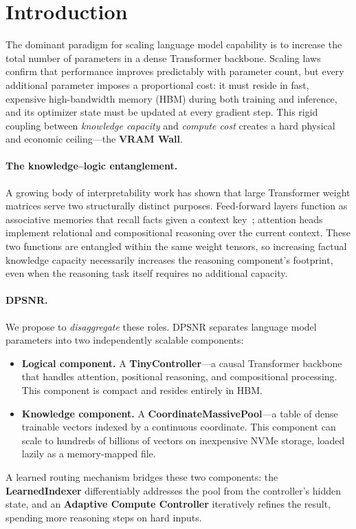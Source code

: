 \documentclass[11pt]{article}
\begin{document}
\section{Introduction}
\label{sec:intro}

The dominant paradigm for scaling language model capability is to increase the
total number of parameters in a dense Transformer backbone.
Scaling laws~\citep{kaplan2020scaling, hoffmann2022chinchilla} confirm that
performance improves predictably with parameter count, but every additional
parameter imposes a proportional cost: it must reside in fast, expensive
high-bandwidth memory (HBM) during both training and inference, and its
optimizer state must be updated at every gradient step.
This rigid coupling between \emph{knowledge capacity} and \emph{compute cost}
creates a hard physical and economic ceiling—the \textbf{VRAM Wall}.

\paragraph{The knowledge–logic entanglement.}
A growing body of interpretability work has shown that large Transformer
weight matrices serve two structurally distinct purposes.
Feed-forward layers function as associative memories that recall facts given a
context key~\citep{geva2021feedforward}; attention heads implement relational
and compositional reasoning over the current context.
These two functions are entangled within the same weight tensors, so
increasing factual knowledge capacity necessarily increases the reasoning
component's footprint, even when the reasoning task itself requires no
additional capacity.

\paragraph{DPSNR.}
We propose to \emph{disaggregate} these roles.
DPSNR separates language model parameters into two independently scalable
components:
\begin{itemize}[leftmargin=1.8em]
  \item \textbf{Logical component.} A \textbf{TinyController}—a causal
        Transformer backbone that handles attention, positional reasoning, and
        compositional processing. This component is compact and resides
        entirely in HBM.
  \item \textbf{Knowledge component.} A \textbf{CoordinateMassivePool}—a
        table of dense trainable vectors indexed by a continuous coordinate.
        This component can scale to hundreds of billions of vectors on
        inexpensive NVMe storage, loaded lazily as a memory-mapped file.
\end{itemize}
A learned routing mechanism bridges these two components: the
\textbf{LearnedIndexer} differentiably addresses the pool from the
controller's hidden state, and an \textbf{Adaptive Compute Controller}
iteratively refines the result, spending more reasoning steps on hard inputs.
\end{document}
